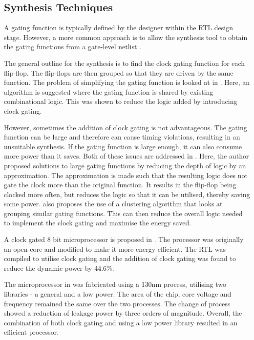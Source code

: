\subsection{Synthesis Techniques}

A gating function is typically defined by the designer within the RTL design stage.
However, a more common approach is to allow the synthesis tool to obtain the gating functions from a gate-level netlist \cite{benini1999symbolic, hurst2008automatic}.

The general outline for the synthesis is to find the clock gating function for each flip-flop.
The flip-flops are then grouped so that they are driven by the same function. 
The problem of simplifying the gating function is looked at in \cite{han2012synthesis}. 
Here, an algorithm is suggested where the gating function is shared by existing combinational logic.
This was shown to reduce the logic added by introducing clock gating.

However, sometimes the addition of clock gating is not advantageous. 
The gating function can be large and therefore can cause timing violations, resulting in an unsuitable synthesis.
If the gating function is large enough, it can also consume more power than it saves.
Both of these issues are addressed in \cite{arbel2009resurrecting}.
Here, the author proposed solutions to large gating functions by reducing the depth of logic by an approximation. 
The approximation is made such that the resulting logic does not gate the clock more than the original function. 
It results in the flip-flop being clocked more often, but reduces the logic so that it can be utilised, thereby saving some power.
\cite{arbel2009resurrecting} also proposes the use of a clustering algorithm that looks at grouping similar gating functions. 
This can then reduce the overall logic needed to implement the clock gating and maximise the energy saved.

A clock gated 8 bit microprocessor is proposed in \cite{hoon2013energy}. 
The processor was originally an open core and modified to make it more energy efficient.
The RTL was compiled to utilise clock gating and the addition of clock gating was found to reduce the dynamic power by 44.6\%.

The microprocessor in \cite{hoon2013energy} was fabricated using a 130nm process, utilising two libraries - a general and a low power. 
The area of the chip, core voltage and frequency remained the same over the two processes. 
The change of process showed a reduction of leakage power by three orders of magnitude. 
Overall, the combination of both clock gating and using a low power library resulted in an efficient processor. 

